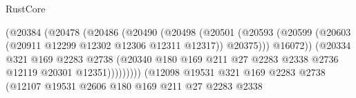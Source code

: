 \begin{lexlean}{RustCore}
\begin{coremodule}
                                          (@20384
                                            (@20478
                                              (@20486
                                                (@20490
                                                  (@20498
                                                    (@20501
                                                      (@20593
                                                        (@20599
                                                          (@20603
                                                            (@20911
                                                              @12299
                                                              @12302
                                                              @12306
                                                              @12311
                                                              @12317))
                                                          @20375)))
                                                    @16072))
                                                (@20334
                                                  @321
                                                  @169
                                                  @2283
                                                  @2738
                                                  (@20340
                                                    @180
                                                    @169
                                                    @211
                                                    @27
                                                    @2283
                                                    @2338
                                                    @2736
                                                    @12119
                                                    @20301
                                                    @12351)))))))))
                                  (@12098
                                    @19531
                                    @321
                                    @169
                                    @2283
                                    @2738
                                    (@12107
                                      @19531
                                      @2606
                                      @180
                                      @169
                                      @211
                                      @27
                                      @2283
                                      @2338

\end{coremodule}
\end{lexlean}
